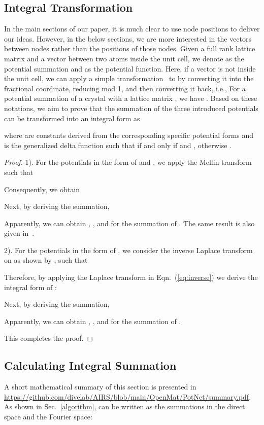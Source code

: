\documentclass[nohyperref]{article}
\theoremstyle{plain}
\theoremstyle{definition}
\theoremstyle{remark}
\begin{document}
\subsection{Integral Transformation}
\label{proof_34_1}
In the main sections of our paper, it is much clear to use node positions to deliver our ideas. However, in the below sections, we are more interested in the vectors between nodes rather than the positions of those nodes. Given a full rank lattice matrix  and a vector  between two atoms inside the unit cell, we denote  as the potential summation and  as the potential function. Here, if a vector  is not inside the unit cell, we can apply a simple transformation~\citep{epstein} to  by converting it into the fractional coordinate, reducing mod 1, and then converting it back, i.e.,  
For a potential summation  of a crystal with a lattice matrix , we have . Based on these notations, we aim to prove that the summation of the three introduced potentials can be transformed into an integral form as 

where  are constants derived from the corresponding specific potential forms and  is the generalized delta function such that  if and only if  and , otherwise .
\begin{proof}
1). For the potentials in the form of  and , we apply the Mellin transform such that

Consequently, we obtain

Next, by deriving the summation,

Apparently, we can obtain , ,  and  for the summation of . The same result is also given in~\citet{epstein}.

2). For the potentials in the form of , we consider the inverse Laplace transform on  as shown by \citet{bateman1954tables}, such that

Therefore, by applying the Laplace transform in Eqn.~(\ref{eq:inverse}) we derive the integral form of : 

Next, by deriving the summation,

Apparently, we can obtain , ,  and  for the summation of .

This completes the proof.
\end{proof}

\subsection{Calculating Integral Summation}
\label{integralsummation}

A short mathematical summary of this section is presented in \url{https://github.com/divelab/AIRS/blob/main/OpenMat/PotNet/summary.pdf}. As shown in Sec.~\ref{algorithm},  can be written as the summations in the direct space and the Fourier space: 
\end{document}
